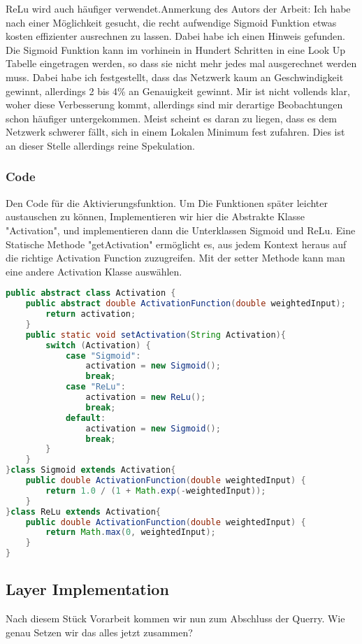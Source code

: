 \documentclass[12pt]{article}
\begin{document}
ReLu wird auch häufiger verwendet.Anmerkung des Autors der Arbeit: Ich habe nach einer Möglichkeit gesucht, die recht aufwendige Sigmoid Funktion etwas kosten effizienter ausrechnen zu lassen. Dabei habe ich einen Hinweis gefunden. Die Sigmoid Funktion kann im vorhinein in Hundert Schritten in eine Look Up Tabelle eingetragen werden, so dass sie nicht mehr jedes mal ausgerechnet werden muss. Dabei habe ich festgestellt, dass das Netzwerk kaum an Geschwindigkeit gewinnt, allerdings 2 bis 4\% an Genauigkeit gewinnt. Mir ist nicht vollends klar, woher diese Verbesserung kommt, allerdings sind mir derartige Beobachtungen schon häufiger untergekommen. Meist scheint es daran zu liegen, dass es dem Netzwerk schwerer fällt, sich in einem Lokalen Minimum fest zufahren. Dies ist an dieser Stelle allerdings reine Spekulation.\subsubsection{ Code}Den Code für die Aktivierungsfunktion. Um Die Funktionen später leichter austauschen zu können, Implementieren wir hier die Abstrakte Klasse "Activation", und implementieren dann die Unterklassen Sigmoid und ReLu. Eine Statische Methode "getActivation" ermöglicht es, aus jedem Kontext heraus auf die richtige Activation Function zuzugreifen. Mit der setter Methode kann man eine andere Activation Klasse auswählen.\begin{lstlisting}[language=Java]
public abstract class Activation {
    public abstract double ActivationFunction(double weightedInput);    static Activation activation = new Sigmoid();    public static Activation geActivation(){
        return activation;
    }
    public static void setActivation(String Activation){
        switch (Activation) {
            case "Sigmoid":
                activation = new Sigmoid();
                break;
            case "ReLu":
                activation = new ReLu();
                break;
            default:
                activation = new Sigmoid();
                break;
        }
    }
}class Sigmoid extends Activation{
    public double ActivationFunction(double weightedInput) {
        return 1.0 / (1 + Math.exp(-weightedInput));
    }
}class ReLu extends Activation{
    public double ActivationFunction(double weightedInput) {
        return Math.max(0, weightedInput);
    }
}
\end{lstlisting}\subsection{ Layer Implementation}Nach diesem Stück Vorarbeit kommen wir nun zum Abschluss der Querry. Wie genau Setzen wir das alles jetzt zusammen?
\end{document}
